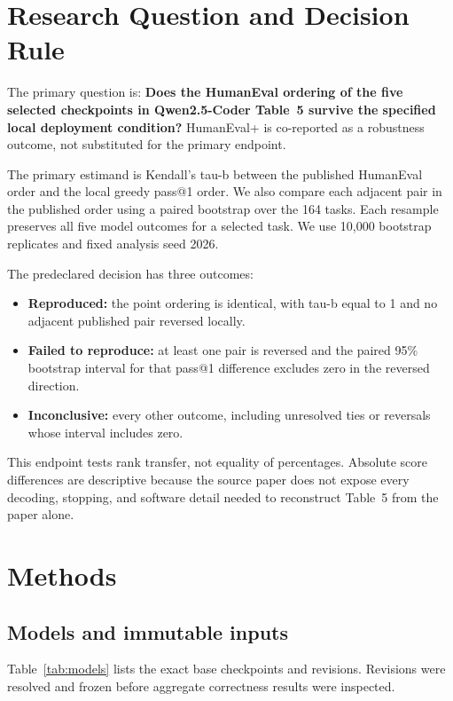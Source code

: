 \documentclass[10pt,twocolumn]{article}
\begin{document}
\section{Research Question and Decision Rule}

The primary question is: \textbf{Does the HumanEval ordering of the five selected checkpoints in Qwen2.5-Coder Table~5 survive the specified local deployment condition?} HumanEval+ is co-reported as a robustness outcome, not substituted for the primary endpoint.

The primary estimand is Kendall's tau-b between the published HumanEval order and the local greedy pass@1 order. We also compare each adjacent pair in the published order using a paired bootstrap over the 164 tasks. Each resample preserves all five model outcomes for a selected task. We use 10,000 bootstrap replicates and fixed analysis seed 2026.

The predeclared decision has three outcomes:

\begin{itemize}
  \item \textbf{Reproduced:} the point ordering is identical, with tau-b equal to 1 and no adjacent published pair reversed locally.
  \item \textbf{Failed to reproduce:} at least one pair is reversed and the paired 95\% bootstrap interval for that pass@1 difference excludes zero in the reversed direction.
  \item \textbf{Inconclusive:} every other outcome, including unresolved ties or reversals whose interval includes zero.
\end{itemize}

This endpoint tests rank transfer, not equality of percentages. Absolute score differences are descriptive because the source paper does not expose every decoding, stopping, and software detail needed to reconstruct Table~5 from the paper alone.

\section{Methods}

\subsection{Models and immutable inputs}

Table~\ref{tab:models} lists the exact base checkpoints and revisions. Revisions were resolved and frozen before aggregate correctness results were inspected.
\end{document}
